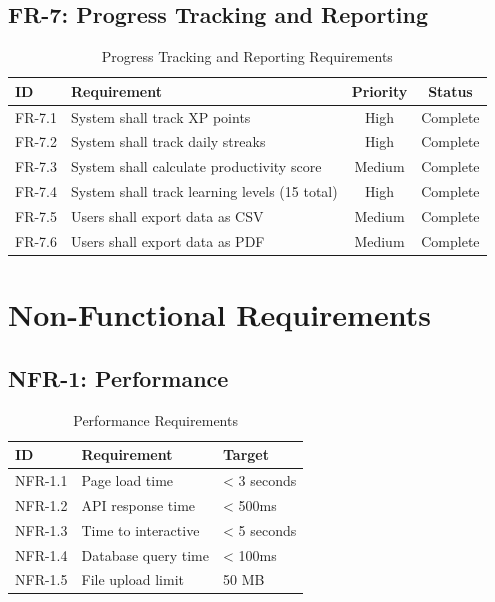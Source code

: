         \subsection{FR-7: Progress Tracking and Reporting}
        \begin{table}[H]
        \centering
        \begin{tabular}{|l|p{7cm}|c|c|}
        \hline
        \textbf{ID} & \textbf{Requirement} & \textbf{Priority} & \textbf{Status} \\
        \hline
        FR-7.1 & System shall track XP points & High & Complete \\
        FR-7.2 & System shall track daily streaks & High & Complete \\
        FR-7.3 & System shall calculate productivity score & Medium & Complete \\
        FR-7.4 & System shall track learning levels (15 total) & High & Complete \\
        FR-7.5 & Users shall export data as CSV & Medium & Complete \\
        FR-7.6 & Users shall export data as PDF & Medium & Complete \\
        \hline
        \end{tabular}
        \caption{Progress Tracking and Reporting Requirements}
        \end{table}

        \section{Non-Functional Requirements}

        \subsection{NFR-1: Performance}
        \begin{table}[H]
        \centering
        \begin{tabular}{|l|l|l|}
        \hline
        \textbf{ID} & \textbf{Requirement} & \textbf{Target} \\
        \hline
        NFR-1.1 & Page load time & < 3 seconds \\
        NFR-1.2 & API response time & < 500ms \\
        NFR-1.3 & Time to interactive & < 5 seconds \\
        NFR-1.4 & Database query time & < 100ms \\
        NFR-1.5 & File upload limit & 50 MB \\
        \hline
        \end{tabular}
        \caption{Performance Requirements}
        \end{table}

